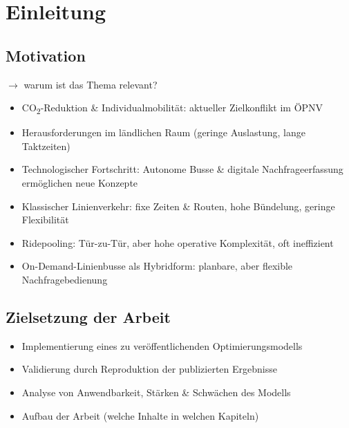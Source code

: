 \chapter{Einleitung}
\section{Motivation} 

$\rightarrow$ warum ist das Thema relevant?


\begin{itemize}
    \item CO\textsubscript{2}-Reduktion \& Individualmobilität: aktueller Zielkonflikt im ÖPNV
    \item Herausforderungen im ländlichen Raum (geringe Auslastung, lange Taktzeiten)
    \item Technologischer Fortschritt: Autonome Busse \& digitale Nachfrageerfassung ermöglichen neue Konzepte
    \item Klassischer Linienverkehr: fixe Zeiten \& Routen, hohe Bündelung, geringe Flexibilität
    \item Ridepooling: Tür-zu-Tür, aber hohe operative Komplexität, oft ineffizient
    \item On-Demand-Linienbusse als Hybridform: planbare, aber flexible Nachfragebedienung
\end{itemize}
\section{Zielsetzung der Arbeit}
\begin{itemize}
    \item Implementierung eines zu veröffentlichenden Optimierungsmodells
    \item Validierung durch Reproduktion der publizierten Ergebnisse
    \item Analyse von Anwendbarkeit, Stärken \& Schwächen des Modells
    \item Aufbau der Arbeit (welche Inhalte in welchen Kapiteln)
\end{itemize}
